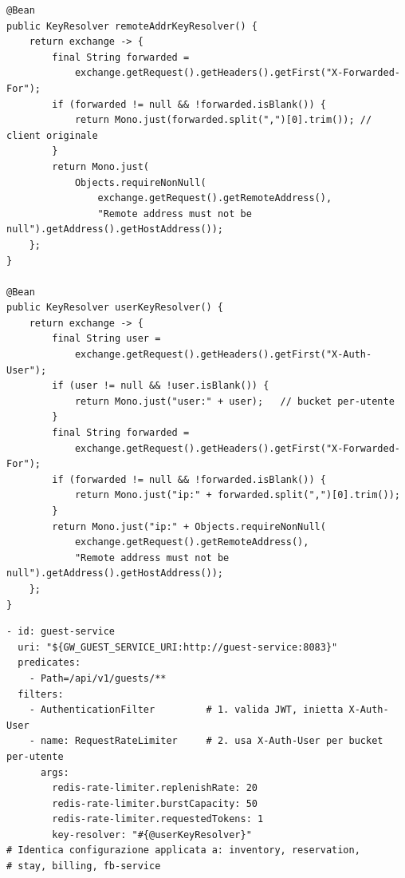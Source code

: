 ﻿\documentclass[a4paper,12pt]{report}
\begin{document}
\begin{securebox}[title={RateLimiterConfig.java — key resolver proxy-aware e per-utente (api-gateway)}]
\begin{lstlisting}[style=java]
@Bean
public KeyResolver remoteAddrKeyResolver() {
    return exchange -> {
        final String forwarded =
            exchange.getRequest().getHeaders().getFirst("X-Forwarded-For");
        if (forwarded != null && !forwarded.isBlank()) {
            return Mono.just(forwarded.split(",")[0].trim()); // client originale
        }
        return Mono.just(
            Objects.requireNonNull(
                exchange.getRequest().getRemoteAddress(),
                "Remote address must not be null").getAddress().getHostAddress());
    };
}

@Bean
public KeyResolver userKeyResolver() {
    return exchange -> {
        final String user =
            exchange.getRequest().getHeaders().getFirst("X-Auth-User");
        if (user != null && !user.isBlank()) {
            return Mono.just("user:" + user);   // bucket per-utente
        }
        final String forwarded =
            exchange.getRequest().getHeaders().getFirst("X-Forwarded-For");
        if (forwarded != null && !forwarded.isBlank()) {
            return Mono.just("ip:" + forwarded.split(",")[0].trim());
        }
        return Mono.just("ip:" + Objects.requireNonNull(
            exchange.getRequest().getRemoteAddress(),
            "Remote address must not be null").getAddress().getHostAddress());
    };
}
\end{lstlisting}
\end{securebox}

\begin{securebox}[title={api-gateway.yml — rate limiting su route business autenticate}]
\begin{lstlisting}[style=yaml]
- id: guest-service
  uri: "${GW_GUEST_SERVICE_URI:http://guest-service:8083}"
  predicates:
    - Path=/api/v1/guests/**
  filters:
    - AuthenticationFilter         # 1. valida JWT, inietta X-Auth-User
    - name: RequestRateLimiter     # 2. usa X-Auth-User per bucket per-utente
      args:
        redis-rate-limiter.replenishRate: 20
        redis-rate-limiter.burstCapacity: 50
        redis-rate-limiter.requestedTokens: 1
        key-resolver: "#{@userKeyResolver}"
# Identica configurazione applicata a: inventory, reservation,
# stay, billing, fb-service
\end{lstlisting}
\end{securebox}
\end{document}
